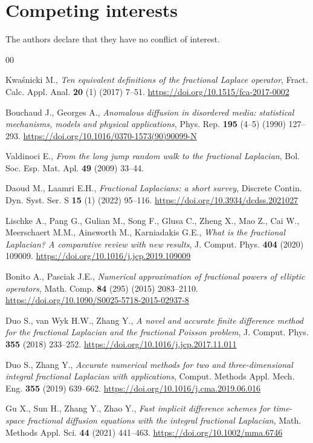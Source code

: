 \documentclass[reqno]{amsart}
\begin{document}
\section*{Competing interests}
\noindent
The authors declare that they have no conflict of interest.
\begin{thebibliography}{00}

Kwaśnicki M., \textit{Ten equivalent definitions of the fractional Laplace operator}, Fract. Calc. Appl. Anal. \textbf{20} (1) (2017) 7--51. \url{https://doi.org/10.1515/fca-2017-0002}

Bouchaud J., Georges A., \textit{Anomalous diffusion in disordered media: statistical mechanisms, models and physical applications}, Phys. Rep. \textbf{195} (4--5) (1990) 127--293. \url{https://doi.org/10.1016/0370-1573(90)90099-N}

Valdinoci E., \textit{From the long jump random walk to the fractional Laplacian}, Bol. Soc. Esp. Mat. Apl. \textbf{49} (2009) 33--44.


Daoud M., Laamri E.H., \textit{Fractional Laplacians: a short survey}, Discrete Contin. Dyn. Syst. Ser. S \textbf{15} (1) (2022) 95--116. \url{https://doi.org/10.3934/dcdss.2021027}


Lischke A., Pang G., Gulian M., Song F., Glusa C., Zheng X., Mao Z., Cai W., Meerschaert M.M., Ainsworth M., Karniadakis G.E.,
\textit{What is the fractional Laplacian? A comparative review with new results},
J. Comput. Phys. \textbf{404} (2020) 109009.
\url{https://doi.org/10.1016/j.jcp.2019.109009}

Bonito A., Pasciak J.E.,
\textit{Numerical approximation of fractional powers of elliptic operators},
Math. Comp. \textbf{84} (295) (2015) 2083--2110.
\url{https://doi.org/10.1090/S0025-5718-2015-02937-8}


Duo S., van Wyk H.W., Zhang Y., \textit{A novel and accurate finite difference method for the fractional Laplacian and the fractional Poisson problem}, J. Comput. Phys. \textbf{355} (2018) 233--252.
\url{https://doi.org/10.1016/j.jcp.2017.11.011}

Duo S., Zhang Y., \textit{Accurate numerical methods for two and three-dimensional integral fractional Laplacian with applications}, Comput. Methods Appl. Mech. Eng. \textbf{355} (2019) 639--662.
\url{https://doi.org/10.1016/j.cma.2019.06.016}

Gu X., Sun H., Zhang Y., Zhao Y., \textit{Fast implicit difference schemes for time-space fractional diffusion equations with the integral fractional Laplacian}, Math. Methods Appl. Sci. \textbf{44} (2021) 441--463.
\url{ https://doi.org/10.1002/mma.6746}


\end{thebibliography}
\end{document}
